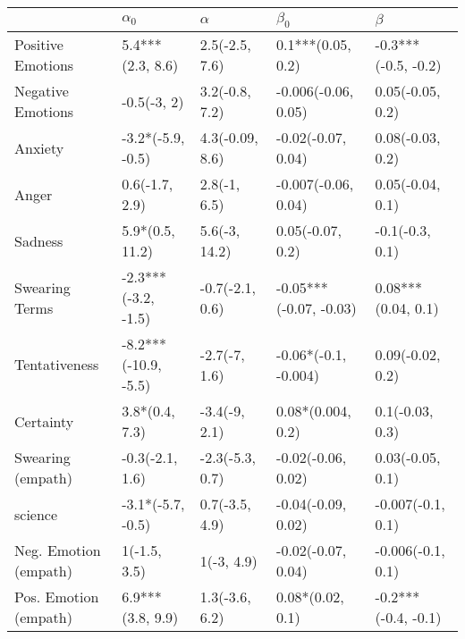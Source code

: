 \begin{tabular}{lllll}
\toprule
{} &            $\alpha_0$ &         $\alpha$ &               $\beta_0$ &              $\beta$ \\
\midrule
Positive Emotions     &      5.4***(2.3, 8.6) &   2.5(-2.5, 7.6) &       0.1***(0.05, 0.2) &  -0.3***(-0.5, -0.2) \\
Negative Emotions     &           -0.5(-3, 2) &   3.2(-0.8, 7.2) &     -0.006(-0.06, 0.05) &     0.05(-0.05, 0.2) \\
Anxiety               &     -3.2*(-5.9, -0.5) &  4.3(-0.09, 8.6) &      -0.02(-0.07, 0.04) &     0.08(-0.03, 0.2) \\
Anger                 &        0.6(-1.7, 2.9) &     2.8(-1, 6.5) &     -0.007(-0.06, 0.04) &     0.05(-0.04, 0.1) \\
Sadness               &       5.9*(0.5, 11.2) &    5.6(-3, 14.2) &        0.05(-0.07, 0.2) &      -0.1(-0.3, 0.1) \\
Swearing Terms        &   -2.3***(-3.2, -1.5) &  -0.7(-2.1, 0.6) &  -0.05***(-0.07, -0.03) &   0.08***(0.04, 0.1) \\
Tentativeness         &  -8.2***(-10.9, -5.5) &    -2.7(-7, 1.6) &    -0.06*(-0.1, -0.004) &     0.09(-0.02, 0.2) \\
Certainty             &        3.8*(0.4, 7.3) &    -3.4(-9, 2.1) &       0.08*(0.004, 0.2) &      0.1(-0.03, 0.3) \\
Swearing (empath)     &       -0.3(-2.1, 1.6) &  -2.3(-5.3, 0.7) &      -0.02(-0.06, 0.02) &     0.03(-0.05, 0.1) \\
science               &     -3.1*(-5.7, -0.5) &   0.7(-3.5, 4.9) &      -0.04(-0.09, 0.02) &    -0.007(-0.1, 0.1) \\
Neg. Emotion (empath) &          1(-1.5, 3.5) &       1(-3, 4.9) &      -0.02(-0.07, 0.04) &    -0.006(-0.1, 0.1) \\
Pos. Emotion (empath) &      6.9***(3.8, 9.9) &   1.3(-3.6, 6.2) &        0.08*(0.02, 0.1) &  -0.2***(-0.4, -0.1) \\
\bottomrule
\end{tabular}
